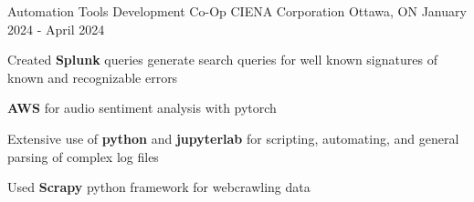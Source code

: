 

\begin{cventries}

  


  \cventry
    {Automation Tools Development Co-Op} %
    {CIENA Corporation} %
    {Ottawa, ON} %
    {January 2024 - April 2024} %
    {
      \begin{cvitems} %
        \item {Created \textbf{Splunk} queries generate search queries for well known signatures of known and recognizable errors}
        \item {\textbf{AWS} for audio sentiment analysis with pytorch}
        \item {Extensive use of \textbf{python} and \textbf{jupyterlab} for scripting, automating, and general parsing of complex log files}
        \item Used \textbf{Scrapy} python framework for webcrawling data
      \end{cvitems}
    }


\end{cventries}
